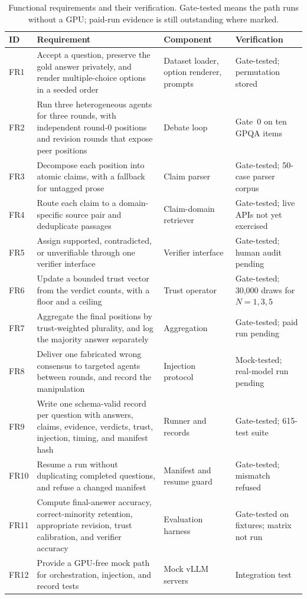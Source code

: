 \begin{table}[H]
  \centering
  \caption{Functional requirements and their verification. Gate-tested means the path runs without a GPU; paid-run evidence is still outstanding where marked.}
  \renewcommand{\arraystretch}{1.25}
  \small
  \begin{tabular}{|p{}|p{}|p{}|p{}|}
    \hline
    ID & Requirement & Component & Verification \\
    \hline
    FR1 & Accept a question, preserve the gold answer privately, and render multiple-choice options in a seeded order & Dataset loader, option renderer, prompts & Gate-tested; permutation stored \\
    \hline
    FR2 & Run three heterogeneous agents for three rounds, with independent round-0 positions and revision rounds that expose peer positions & Debate loop & Gate~0 on ten GPQA items \\
    \hline
    FR3 & Decompose each position into atomic claims, with a fallback for untagged prose & Claim parser & Gate-tested; 50-case parser corpus \\
    \hline
    FR4 & Route each claim to a domain-specific source pair and deduplicate passages & Claim-domain retriever & Gate-tested; live APIs not yet exercised \\
    \hline
    FR5 & Assign supported, contradicted, or unverifiable through one verifier interface & Verifier interface & Gate-tested; human audit pending \\
    \hline
    FR6 & Update a bounded trust vector from the verdict counts, with a floor and a ceiling & Trust operator & Gate-tested; 30,000 draws for $N=1,3,5$ \\
    \hline
    FR7 & Aggregate the final positions by trust-weighted plurality, and log the majority answer separately & Aggregation & Gate-tested; paid run pending \\
    \hline
    FR8 & Deliver one fabricated wrong consensus to targeted agents between rounds, and record the manipulation & Injection protocol & Mock-tested; real-model run pending \\
    \hline
    FR9 & Write one schema-valid record per question with answers, claims, evidence, verdicts, trust, injection, timing, and manifest hash & Runner and records & Gate-tested; 615-test suite \\
    \hline
    FR10 & Resume a run without duplicating completed questions, and refuse a changed manifest & Manifest and resume guard & Gate-tested; mismatch refused \\
    \hline
    FR11 & Compute final-answer accuracy, correct-minority retention, appropriate revision, trust calibration, and verifier accuracy & Evaluation harness & Gate-tested on fixtures; matrix not run \\
    \hline
    FR12 & Provide a GPU-free mock path for orchestration, injection, and record tests & Mock vLLM servers & Integration test \\
    \hline
  \end{tabular}
  \label{tab:functional-requirements}
\end{table}

